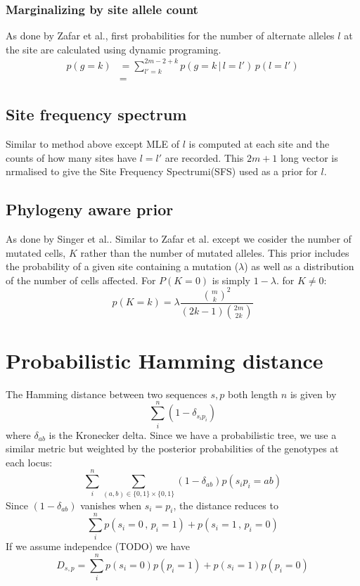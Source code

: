 \documentclass{article}
\begin{document}
\subsubsection*{Marginalizing by site allele count}
As done by Zafar et al., first probabilities for the number of alternate alleles $l$ at the site are calculated using dynamic programing.\\
\begin{align*}
p(g=k) &= \sum\limits_{l'=k}^{2m-2+k} p(g=k \,|\,l=l') \,p(l=l')\\
&=
\end{align*}
\subsection*{Site frequency spectrum}
Similar to method above except MLE of $l$ is computed at each site and the counts of how many sites have $l=l'$ are recorded. This $2m+1$ long vector is nrmalised to give the Site Frequency Spectrumi(SFS) used as a prior for $l$.
\subsection*{Phylogeny aware prior}
As done by Singer et al.. Similar to Zafar et al. except we cosider the number of mutated cells, $K$ rather than the number of mutated alleles. 
This prior includes the probability of a given site containing a mutation ($\lambda$) as well as a distribution of the number of cells affected. For $P(K=0)$ is simply $1-\lambda$. for $K\neq 0 $:
\[p(K=k) = \lambda\frac{\binom{m}{k}^2}{(2k-1)\binom{2m}{2k}}\]

\section{Probabilistic Hamming distance}
The Hamming distance between two sequences $s,p$ both length $n$ is given by \[\sum\limits_i^n (1-\delta_{s_ip_i})\] where $\delta_{ab}$ is the Kronecker delta.
Since we have a probabilistic tree, we use a similar metric but weighted by the posterior probabilities of the genotypes at each locus:
\[\sum\limits_i^n \sum\limits_{(a,b)\in\{0,1\}\times\{0,1\}}(1-\delta_{ab})p(s_ip_i = ab)\]
Since $(1-\delta_{ab})$ vanishes when $s_i = p_i$, the distance reduces to
\[\sum\limits_i^n p(s_i = 0\,,\,p_i=1)+p(s_i=1\,,\,p_i=0)\]
If we assume independce (TODO) we have
\[D_{s,p} = \sum\limits_i^n p(s_i = 0)p(p_i=1)+p(s_i=1)p(p_i=0)\]
\end{document}
